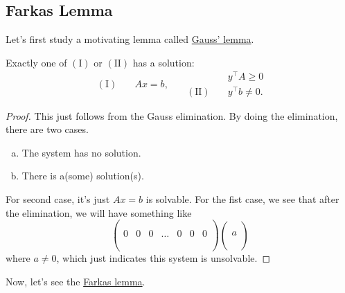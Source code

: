 \subsection{Farkas Lemma}
Let's first study a motivating lemma called \hyperref[lma:Gauss]{Gauss' lemma}.

\begin{lemma}\label{lma:Gauss}
	Exactly one of \((\mathrm{I})\) or \((\mathrm{II})\) has a solution:
	\[
		\begin{aligned}
			(\mathrm{I})\quad & Ax = b,
		\end{aligned}\quad
		\begin{aligned}
			                   & y^{\top}A\geq 0   \\
			(\mathrm{II})\quad & y^{\top}b\neq  0.
		\end{aligned}
	\]
\end{lemma}
\begin{proof}
	This just follows from the Gauss elimination. By doing the elimination, there are two cases.
	\begin{enumerate}[(a)]
		\item The system has no solution.
		\item There is a(some) solution(s).
	\end{enumerate}

	For second case, it's just \(Ax = b\) is solvable.  For the fist case, we see that after the elimination, we will have something like
	\[
		\begin{pmatrix}
			  &   &   &        &   &   &   \\
			  &   &   &        &   &   &   \\
			0 & 0 & 0 & \ldots & 0 & 0 & 0 \\
			  &   &   &        &   &   &   \\
			  &   &   &        &   &   &   \\
		\end{pmatrix}
		\begin{pmatrix}
			\\
			\\
			a \\
			\\
			\\
		\end{pmatrix}
	\]
	where \(a\neq 0\), which just indicates this system is unsolvable.
\end{proof}

Now, let's see the \hyperref[lma:Farkas]{Farkas lemma}.

